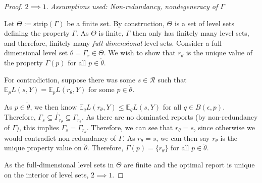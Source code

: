 \documentclass[12pt]{article}
\newcommand{\E}{\mathbb{E}}
\newcommand{\R}{\mathcal{R}}
\newcommand{\inter}[1]{\mathring{#1}}%
\newcommand{\im}{\text{im}}
\newcommand{\strip}{\text{strip}}
\begin{document}
\begin{proof}





\bigskip
$2 \implies 1$.  
\emph{Assumptions used: Non-redundancy, nondegeneracy of $\Gamma$}

Let $\Theta := \strip(\Gamma)$ be a finite set.
By construction, $\Theta$ is a set of level sets defining the property $\Gamma$.
As $\Theta$ is finite, $\Gamma$ then only has finitely many level sets, and therefore, finitely many \emph{full-dimensional} level sets.
Consider a full-dimensional level set $\theta = \Gamma_r \in \Theta$.
We wish to show that $r_\theta$ is the unique value of the property $\Gamma(p)$ for all $p \in \inter{\theta}$.

For contradiction, suppose there was some $s \in \R$ such that $\E_p L(s,Y) = \E_p L(r_\theta, Y)$ for some $p \in \inter{\theta}$.

As $p \in \inter{\theta}$, we then know $\E_q L(r_\theta, Y) \leq \E_q L(s,Y)$ for all $q \in B(\epsilon, p)$.
Therefore, $\Gamma_s \subseteq \inter{\Gamma_{r_\theta}} \subseteq \Gamma_{r_\theta}$.
As there are no dominated reports (by non-redundancy of $\Gamma$), this implies $\Gamma_s = \Gamma_{r_\theta}$.
Therefore, we can see that $r_\theta = s$, since otherwise we would contradict non-redundancy of $\Gamma$.
As $r_\theta = s$, we can then say $r_\theta$ is the unique property value on $\inter{\theta}$.
Therefore, $\Gamma(p) = \{r_\theta\}$ for all $p \in \inter{\theta}$.

As the full-dimensional level sets in $\Theta$ are finite and the optimal report is unique on the interior of level sets, $2 \implies 1$.

\end{proof}
\end{document}
